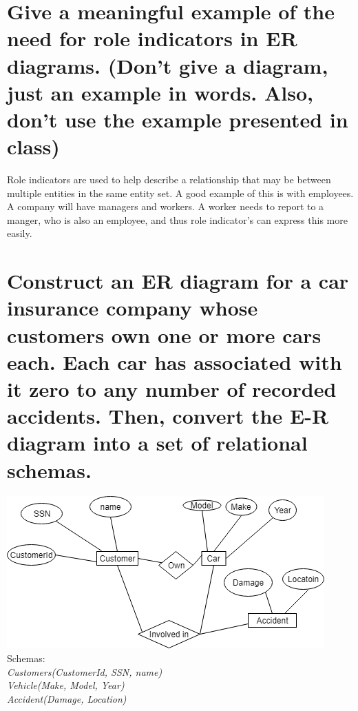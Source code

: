 \documentclass[12pt]{article}
\newcommand\tab[1][1cm]{\hspace{#1}}
\begin{document}
\section{Give a meaningful example of the need for role indicators in ER diagrams. (Don't give a diagram, just an example in words. Also, don't use the example presented in class)}
\tab Role indicators are used to help describe a relationship that may be between multiple entities in the same entity set. A good example of this is with employees. A company will have managers and workers. A worker needs to report to a manger, who is also an employee, and thus role indicator's can express this more easily. 
\section{Construct an ER diagram for a car insurance company whose customers own one or more cars each. Each car has associated with it zero to any number of recorded accidents. Then, convert the E-R diagram into a set of relational schemas.}
\includegraphics[scale=0.75]{Homeworksssss.png}\\
Schemas: \\
\textit{Customers(CustomerId, SSN, name)} \\
\textit{Vehicle(Make, Model, Year)} \\
\textit{Accident(Damage, Location)}
\end{document}
